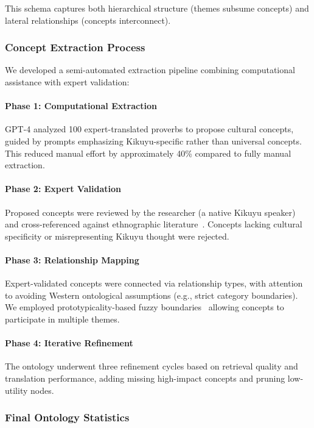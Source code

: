 This schema captures both hierarchical structure (themes subsume concepts) and lateral relationships (concepts interconnect).

\subsubsection{Concept Extraction Process}

We developed a semi-automated extraction pipeline combining computational assistance with expert validation:

\paragraph{Phase 1: Computational Extraction} GPT-4 analyzed 100 expert-translated proverbs to propose cultural concepts, guided by prompts emphasizing Kikuyu-specific rather than universal concepts. This reduced manual effort by approximately 40\% compared to fully manual extraction.

\paragraph{Phase 2: Expert Validation} Proposed concepts were reviewed by the researcher (a native Kikuyu speaker) and cross-referenced against ethnographic literature~\cite{kenyatta1938facing,mbiti1990african}. Concepts lacking cultural specificity or misrepresenting Kikuyu thought were rejected.

\paragraph{Phase 3: Relationship Mapping} Expert-validated concepts were connected via relationship types, with attention to avoiding Western ontological assumptions (e.g., strict category boundaries). We employed prototypicality-based fuzzy boundaries~\cite{rosch1973natural} allowing concepts to participate in multiple themes.

\paragraph{Phase 4: Iterative Refinement} The ontology underwent three refinement cycles based on retrieval quality and translation performance, adding missing high-impact concepts and pruning low-utility nodes.

\subsubsection{Final Ontology Statistics}

